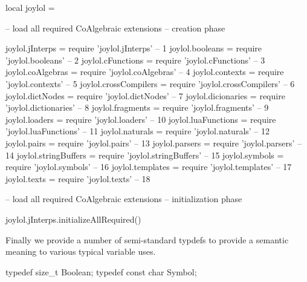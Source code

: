 \startLuaCode
local joylol = { }

-- load all required CoAlgebraic extensions -- creation phase

joylol.jInterps       = require 'joylol.jInterps'       --  1
joylol.booleans       = require 'joylol.booleans'       --  2
joylol.cFunctions     = require 'joylol.cFunctions'     --  3
joylol.coAlgebras     = require 'joylol.coAlgebras'     --  4
joylol.contexts       = require 'joylol.contexts'       --  5
joylol.crossCompilers = require 'joylol.crossCompilers' --  6
joylol.dictNodes      = require 'joylol.dictNodes'      --  7
joylol.dicionaries    = require 'joylol.dictionaries'   --  8
joylol.fragments      = require 'joylol.fragments'      --  9
joylol.loaders        = require 'joylol.loaders'        -- 10
joylol.luaFunctions   = require 'joylol.luaFunctions'   -- 11
joylol.naturals       = require 'joylol.naturals'       -- 12
joylol.pairs          = require 'joylol.pairs'          -- 13
joylol.parsers        = require 'joylol.parsers'        -- 14
joylol.stringBuffers  = require 'joylol.stringBuffers'  -- 15
joylol.symbols        = require 'joylol.symbols'        -- 16
joylol.templates      = require 'joylol.templates'      -- 17
joylol.texts          = require 'joylol.texts'          -- 18

-- load all required CoAlgebraic extensions -- initialization phase

joylol.jInterps.initializeAllRequired()

\stopLuaCode

Finally we provide a number of semi-standard typdefs to provide a semantic 
meaning to various typical variable uses. 

\startCHeader
typedef size_t     Boolean;
typedef const char Symbol;
\stopCHeader
